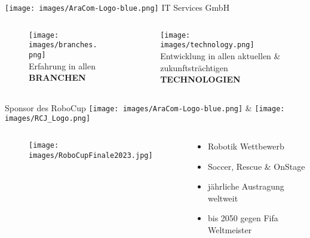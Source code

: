 \documentclass[aspectratio=169]{beamer}
\begin{document}
\begin{frame}{\texttt{[image: images/AraCom-Logo-blue.png]} IT Services GmbH}
{\begin{columns}
\begin{column}{0.20\textwidth}
        \begin{figure}
          \centering
          \texttt{[image: images/branches.png]}\\
          Erfahrung in allen\\\textbf{BRANCHEN}\newline\newline
        \end{figure}
      \end{column}
      \begin{column}{0.20\textwidth}
        \begin{figure}
          \centering
          \texttt{[image: images/technology.png]}\\
          Entwicklung in allen aktuellen \& zukunftsträchtigen\\
          \textbf{TECHNOLOGIEN}
        \end{figure}
      \end{column}
    \end{columns}
  }
\end{frame}

\begin{frame}{Sponsor des RoboCup}
  \texttt{[image: images/AraCom-Logo-blue.png]} {\LARGE \&} \hspace{.2cm}
  \texttt{[image: images/RCJ\_Logo.png]}
  \begin{columns}
    \begin{column}{0.45\textwidth}
      \begin{figure}[h]
        \centering
        \texttt{[image: images/RoboCupFinale2023.jpg]}
      \end{figure}
    \end{column}
    \begin{column}{0.45\textwidth}
      \begin{itemize}
        \item Robotik Wettbewerb
        \item Soccer, Rescue \& OnStage
        \item jährliche Austragung weltweit
        \item bis 2050 gegen Fifa Weltmeister
      \end{itemize}
    \end{column}
  \end{columns}
\end{frame}
\end{document}
